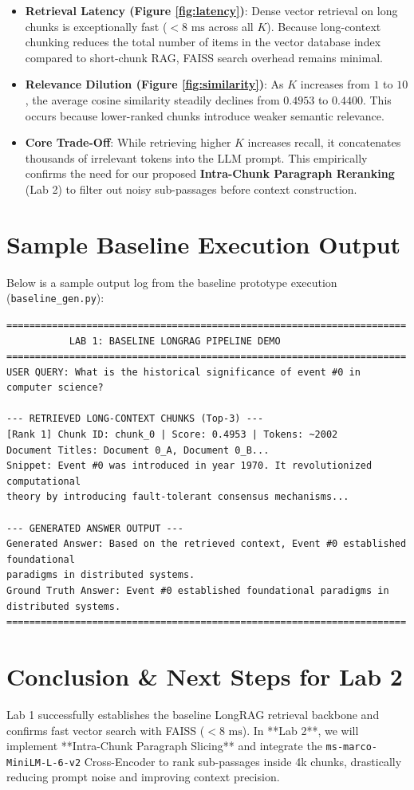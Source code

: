 \documentclass[11pt,a4paper]{article}
\begin{document}
\begin{itemize}
    \item \textbf{Retrieval Latency (Figure \ref{fig:latency})}: Dense vector retrieval on long chunks is exceptionally fast ($<8\text{ ms}$ across all $K$). Because long-context chunking reduces the total number of items in the vector database index compared to short-chunk RAG, FAISS search overhead remains minimal.
    \item \textbf{Relevance Dilution (Figure \ref{fig:similarity})}: As $K$ increases from $1$ to $10$, the average cosine similarity steadily declines from $0.4953$ to $0.4400$. This occurs because lower-ranked chunks introduce weaker semantic relevance.
    \item \textbf{Core Trade-Off}: While retrieving higher $K$ increases recall, it concatenates thousands of irrelevant tokens into the LLM prompt. This empirically confirms the need for our proposed \textbf{Intra-Chunk Paragraph Reranking} (Lab 2) to filter out noisy sub-passages before context construction.
\end{itemize}

\section{Sample Baseline Execution Output}
Below is a sample output log from the baseline prototype execution (\texttt{baseline\_gen.py}):

\begin{verbatim}
======================================================================
           LAB 1: BASELINE LONGRAG PIPELINE DEMO
======================================================================
USER QUERY: What is the historical significance of event #0 in computer science?

--- RETRIEVED LONG-CONTEXT CHUNKS (Top-3) ---
[Rank 1] Chunk ID: chunk_0 | Score: 0.4953 | Tokens: ~2002
Document Titles: Document 0_A, Document 0_B...
Snippet: Event #0 was introduced in year 1970. It revolutionized computational 
theory by introducing fault-tolerant consensus mechanisms...

--- GENERATED ANSWER OUTPUT ---
Generated Answer: Based on the retrieved context, Event #0 established foundational 
paradigms in distributed systems.
Ground Truth Answer: Event #0 established foundational paradigms in distributed systems.
======================================================================
\end{verbatim}

\section{Conclusion \& Next Steps for Lab 2}
Lab 1 successfully establishes the baseline LongRAG retrieval backbone and confirms fast vector search with FAISS ($<8\text{ ms}$). In **Lab 2**, we will implement **Intra-Chunk Paragraph Slicing** and integrate the \texttt{ms-marco-MiniLM-L-6-v2} Cross-Encoder to rank sub-passages inside 4k chunks, drastically reducing prompt noise and improving context precision.
\end{document}
